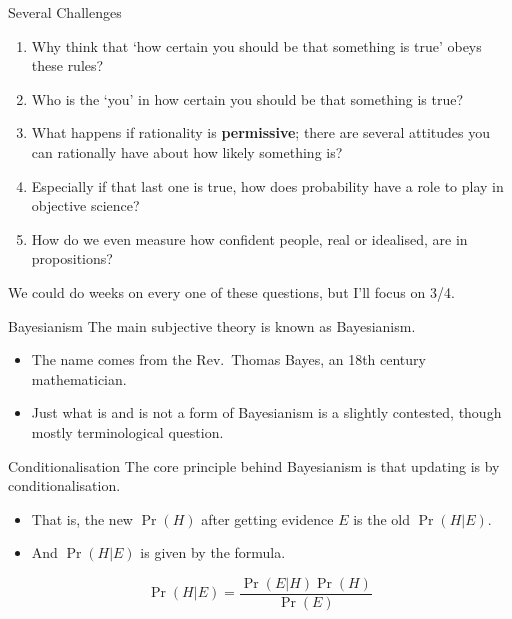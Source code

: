 \documentclass[
  ignorenonframetext,
]{beamer}
\providecommand{\tightlist}{%
  \setlength{\itemsep}{0pt}\setlength{\parskip}{0pt}}
\renewcommand{\,}{\text{, }}
\begin{document}
\begin{frame}{Several Challenges}
\protect\hypertarget{several-challenges}{}
\begin{enumerate}
\tightlist
\item
  Why think that `how certain you should be that something is true'
  obeys these rules? \pause
\item
  Who is the `you' in how certain you should be that something is true?
  \pause
\item
  What happens if rationality is \textbf{permissive}; there are several
  attitudes you can rationally have about how likely something is?
  \pause
\item
  Especially if that last one is true, how does probability have a role
  to play in objective science? \pause
\item
  How do we even measure how confident people, real or idealised, are in
  propositions? \pause
\end{enumerate}

We could do weeks on every one of these questions, but I'll focus on
3/4.
\end{frame}

\begin{frame}{Bayesianism}
\protect\hypertarget{bayesianism}{}
The main subjective theory is known as Bayesianism.

\begin{itemize}
\tightlist
\item
  The name comes from the Rev.~Thomas Bayes, an 18th century
  mathematician.
\item
  Just what is and is not a form of Bayesianism is a slightly contested,
  though mostly terminological question.
\end{itemize}
\end{frame}

\begin{frame}{Conditionalisation}
\protect\hypertarget{conditionalisation}{}
The core principle behind Bayesianism is that updating is by
conditionalisation.

\begin{itemize}
\tightlist
\item
  That is, the new \(\Pr(H)\) after getting evidence \(E\) is the old
  \(\Pr(H | E)\).
\item
  And \(\Pr(H | E)\) is given by the formula.
\end{itemize}

\[
\Pr(H | E) = \frac{\Pr(E | H)\Pr(H)}{\Pr(E)}
\]
\end{frame}
\end{document}

